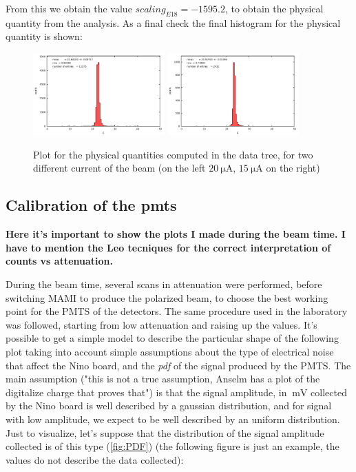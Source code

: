 From this we obtain the value $scaling_{E18} = -1595.2$, to obtain the physical quantity from the analysis. As a final check the final histogram for the physical quantity is shown:

\begin{figure}[hbtp]
\centering
\includegraphics[width = 0.45\textwidth]{Analysis/ENMOCheck20.pdf}
\includegraphics[width = 0.45\textwidth]{Analysis/ENMOCheck15.pdf} 
\caption{Plot for the physical quantities computed in the data tree, for two different current of the beam (on the left $\SI{20}{\micro \ampere}$, $\SI{15}{\micro \ampere}$ on the right)}
\end{figure}



\subsection{Calibration of the pmts}

{\bfseries Here it's important to show the plots I made during the beam time. I have to mention the Leo tecniques for the correct interpretation of counts vs attenuation.}

During the beam time, several scans in attenuation were performed, before switching MAMI to produce the polarized beam, to choose the best working point for the PMTS of the detectors. The same procedure used in the laboratory was followed, starting from low attenuation and raising up the values. It's possible to get a simple model to describe the particular shape of the following plot taking into account simple assumptions about the type of electrical noise that affect the Nino board, and the \textit{pdf} of the signal produced by the PMTS.
The main assumption ("this is not a true assumption, Anselm has a plot of the digitalize charge that proves that") is that the signal amplitude, in $\SI{}{\milli \volt}$ collected by the Nino board is well described by a gaussian distribution, and for signal with low amplitude, we expect to be well described by an uniform distribution. Just to visualize, let's suppose that the distribution of the signal amplitude collected is of this type (\ref{fig:PDF}) (the following figure is just an example, the values ​​do not describe the data collected):

